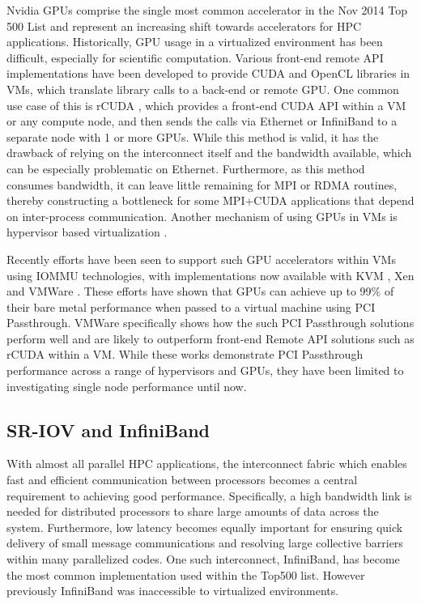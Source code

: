 \documentclass[10pt]{sigplanconf}
\begin{document}
Nvidia GPUs comprise the single most common accelerator in the Nov 2014 Top 500 List \cite{www-top500} and represent an increasing shift towards accelerators for HPC applications. Historically, GPU usage in a virtualized environment has been difficult, especially for scientific computation. Various front-end remote API implementations have been developed to provide CUDA and OpenCL libraries in VMs, which translate library calls to a back-end or remote GPU. One common use case of this is rCUDA \cite{duato2011enabling}, which provides a front-end CUDA API within a VM or any compute node, and then sends the calls via Ethernet or InfiniBand to a separate node with 1 or more GPUs. While this method is valid, it has the drawback of relying on the interconnect itself and the bandwidth available, which can be especially problematic on Ethernet. Furthermore, as this method consumes bandwidth, it can leave little remaining for MPI or RDMA routines, thereby constructing a bottleneck for some MPI+CUDA applications that depend on inter-process communication.  Another mechanism of using GPUs in VMs is hypervisor based virtualization \cite{suzuki2014gpuvm}.

Recently efforts have been seen to support such GPU accelerators within VMs using IOMMU technologies, with implementations now available with KVM \cite{Walters2014cloud}, Xen \cite{Younge2014hpgc, tian2014full} and VMWare \cite{Vu2014}.  These efforts have shown that GPUs can achieve up to 99\% of their bare metal performance when passed to a virtual machine using PCI Passthrough.  VMWare specifically shows how the such PCI Passthrough solutions perform well and are likely to outperform front-end Remote API solutions such as rCUDA within a VM\cite{Vu2014}.  While these works demonstrate PCI Passthrough performance across a range of hypervisors and GPUs, they have been limited to investigating single node performance until now. 

\subsection{SR-IOV and InfiniBand}

With almost all parallel HPC applications, the interconnect fabric which enables fast and efficient communication between processors becomes a central requirement to achieving good performance. Specifically, a high bandwidth link is needed for distributed processors to share large amounts of data across the system. Furthermore, low latency becomes equally important for ensuring quick delivery of small message communications and resolving large collective barriers within many parallelized codes. One such interconnect, InfiniBand, has become the most common implementation used within the Top500 list. However previously InfiniBand was inaccessible to virtualized environments.  
\end{document}
